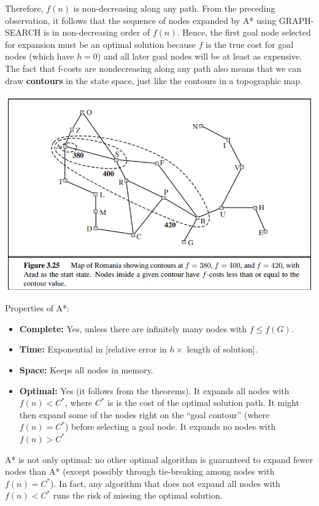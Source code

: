 Therefore, $f(n)$ is non-decreasing along any path.\newline\newline
From the preceding observation, it follows that the sequence of nodes expanded by A* using GRAPH-SEARCH is in non-decreasing order of $f(n)$.  Hence, the first goal node selected for expansion must be an optimal solution because $f$ is the true cost for goal nodes (which have $h = 0$) and all later goal nodes will be at least as expensive.\newline\newline
The fact that f-costs are nondecreasing along any path also means that we can draw \textbf{contours} in the state space, just like the contours in a topographic map.
\begin{center}
    \includegraphics[scale=0.8]{images/topological map.png}
\end{center}
Properties of A*:
\begin{itemize}
    \item \textbf{Complete:} Yes, unless there are infinitely many nodes with $f \leq f(G)$.

    \item \textbf{Time:} Exponential in [relative error in $h \times$ length of solution].

    \item \textbf{Space:} Keeps all nodes in memory.

    \item \textbf{Optimal:} Yes (it follows from the theorems). It expands all nodes with $f(n) < C^*$, where $C^*$ is is the cost of the optimal solution path. It might then expand some of the nodes right on the “goal contour” (where $f(n) = C^*$) before selecting a goal node. It expands no nodes with $f(n) > C^*$
\end{itemize}
A* is not only optimal: no other optimal algorithm is guaranteed to expand fewer nodes than A* (except possibly through tie-breaking among nodes with $f(n) = C^*$). In fact, any algorithm that does not expand all nodes with $f(n) < C^*$ runs the risk of missing the optimal solution.


